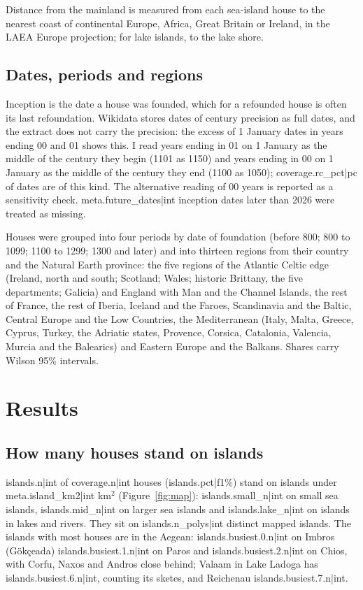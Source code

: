 \documentclass[11pt,a4paper]{article}
\begin{document}
Distance from the mainland is measured from each sea-island house to the nearest coast of continental Europe, Africa, Great Britain or Ireland, in the LAEA Europe projection; for lake islands, to the lake shore.

\subsection{Dates, periods and regions}
Inception is the date a house was founded, which for a refounded house is often its last refoundation. Wikidata stores dates of century precision as full dates, and the extract does not carry the precision: the excess of 1 January dates in years ending 00 and 01 shows this. I read years ending in 01 on 1 January as the middle of the century they begin (1101 as 1150) and years ending in 00 on 1 January as the middle of the century they end (1100 as 1050); {{coverage.rc_pct|pc}} of dates are of this kind. The alternative reading of 00 years is reported as a sensitivity check. {{meta.future_dates|int}} inception dates later than 2026 were treated as missing.

Houses were grouped into four periods by date of foundation (before 800; 800 to 1099; 1100 to 1299; 1300 and later) and into thirteen regions from their country and the Natural Earth province: the five regions of the Atlantic Celtic edge (Ireland, north and south; Scotland; Wales; historic Brittany, the five departments; Galicia) and England with Man and the Channel Islands, the rest of France, the rest of Iberia, Iceland and the Faroes, Scandinavia and the Baltic, Central Europe and the Low Countries, the Mediterranean (Italy, Malta, Greece, Cyprus, Turkey, the Adriatic states, Provence, Corsica, Catalonia, Valencia, Murcia and the Balearics) and Eastern Europe and the Balkans. Shares carry Wilson 95\% intervals.

\section{Results}
\subsection{How many houses stand on islands}
{{islands.n|int}} of {{coverage.n|int}} houses ({{islands.pct|f1}}\%) stand on islands under {{meta.island_km2|int}} km$^2$ (Figure~\ref{fig:map}): {{islands.small_n|int}} on small sea islands, {{islands.mid_n|int}} on larger sea islands and {{islands.lake_n|int}} on islands in lakes and rivers. They sit on {{islands.n_polys|int}} distinct mapped islands. The islands with most houses are in the Aegean: {{islands.busiest.0.n|int}} on Imbros (Gökçeada) {{islands.busiest.1.n|int}} on Paros and {{islands.busiest.2.n|int}} on Chios, with Corfu, Naxos and Andros close behind; Valaam in Lake Ladoga has {{islands.busiest.6.n|int}}, counting its sketes, and Reichenau {{islands.busiest.7.n|int}}.
\end{document}
